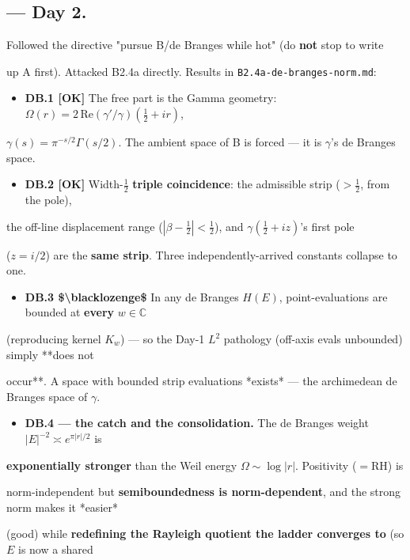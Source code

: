 \documentclass[10pt]{article}
\begin{document}
\subsection*{ --- Day 2.}
Followed the directive "pursue B/de Branges while hot" (do \textbf{not} stop to write\par
up A first). Attacked B2.4a directly. Results in \texttt{B2.4a-de-branges-norm.md}:\par
\begin{itemize}
\item \textbf{DB.1 [OK]} The free part is the Gamma geometry: $\Omega(r)=2\,\mathrm{Re}(\gamma'/\gamma)(\tfrac12+ir)$,
\end{itemize}
  $\gamma(s)=\pi^{-s/2}\Gamma(s/2)$. The ambient space of B is forced --- it is $\gamma$'s de Branges space.\par
\begin{itemize}
\item \textbf{DB.2 [OK]} Width-$\tfrac12$ \textbf{triple coincidence}: the admissible strip ($>\tfrac12$, from the pole),
\end{itemize}
  the off-line displacement range ($|\beta-\tfrac12|<\tfrac12$), and $\gamma(\tfrac12+iz)$'s first pole\par
  ($z=i/2$) are the \textbf{same strip}. Three independently-arrived constants collapse to one.\par
\begin{itemize}
\item \textbf{DB.3 \$\textbackslash{}blacklozenge\$} In any de Branges $H(E)$, point-evaluations are bounded at \textbf{every} $w\in\mathbb C$
\end{itemize}
  (reproducing kernel $K_w$) --- so the Day-1 $L^2$ pathology (off-axis evals unbounded) simply **does not\par
  occur**. A space with bounded strip evaluations *exists* --- the archimedean de Branges space of $\gamma$.\par
\begin{itemize}
\item \textbf{DB.4 --- the catch and the consolidation.} The de Branges weight $|E|^{-2}\asymp e^{\pi|r|/2}$ is
\end{itemize}
  \textbf{exponentially stronger} than the Weil energy $\Omega\sim\log|r|$. Positivity ($=$RH) is\par
  norm-independent but \textbf{semiboundedness is norm-dependent}, and the strong norm makes it *easier*\par
  (good) while \textbf{redefining the Rayleigh quotient the ladder converges to} (so $E$ is now a shared\par
\end{document}
